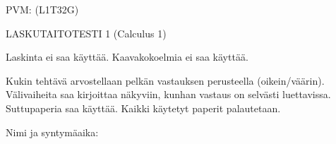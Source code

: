 \documentclass[finnish, a4paper, 12pt]{article}
\begin{document}
	
	
		PVM: \underline{\phantom{mm.mm.}}
		\hfill
		(L1T32G)	%
	
	\begin{center}
		{\large
			LASKUTAITOTESTI 1 (Calculus 1)}
	\end{center}
	
	Laskinta ei saa käyttää. Kaavakokoelmia ei saa käyttää.
	
	Kukin tehtävä arvostellaan pelkän vastauksen perusteella (oikein/väärin).
	Välivaiheita saa kirjoittaa näkyviin, kunhan vastaus on selvästi luettavissa.
	Suttupaperia saa käyttää. Kaikki käytetyt paperit palautetaan.
	
\vspace{12pt}
Nimi ja syntymäaika: \phantom{m} \hrulefill
\vspace{8pt}
	
\end{document}
